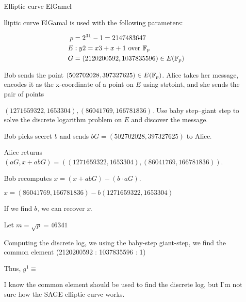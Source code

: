 \begin{problem}
  Elliptic curve ElGamel
  
  lliptic curve ElGamal is used with the following parameters:
  
  \begin{align*}
    p &= 2^{31} - 1 = 2147483647\\
    E &: y2 = x3 + x + 1 \text{ over } \mathbb{F}_{p}\\
    G &= (2120200592, 1037835596) \in E(\mathbb{F}_{p})\\
  \end{align*}
  
  Bob sends the point
  $(502702028, 397327625) \in E(\mathbb{F}_{p})$.
  Alice takes her message, encodes it as the x-coordinate of a point on $E$ using strtoint,
  and she sends the pair of points
  
  \noindent
  $(1271659322, 1653304), (86041769, 166781836)$.
  Use baby step–giant step to solve the discrete logarithm problem on $E$ and discover the
  message.
  
  \end{problem}
  \begin{Answer}
    Bob picks secret $b$ and sends $bG  = (502702028, 397327625)$ to Alice.

    \noindent
    Alice returns $(aG, x + abG) = ((1271659322, 1653304), (86041769, 166781836))$.

    \noindent
    Bob recomputes $x = (x + abG) - (b \cdot aG)$.

    $x = (86041769, 166781836) - b(1271659322, 1653304)$

    If we find $b$, we can recover $x$.

    Let $m = \sqrt{p} = 46341$

    Computing the discrete log, we using the baby-step giant-step,
    we find the common element (2120200592 : 1037835596 : 1)

    \noindent
    Thus, $g^{1} \equiv $

    I know the common element should be used to find the discrete log,
    but I'm not sure how the SAGE elliptic curve works. 
  
  \end{Answer}

